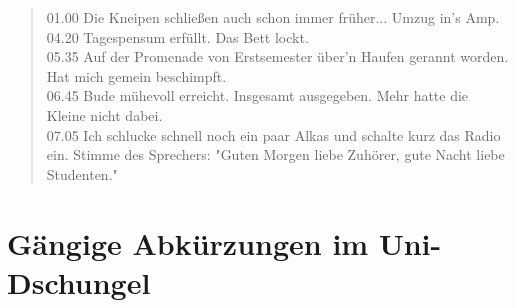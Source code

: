 \begin{verse}
01.00 Die Kneipen schließen auch schon immer früher... Umzug in's Amp.\\ 
04.20 Tagespensum erfüllt. Das Bett lockt.\\ 
05.35 Auf der Promenade von Erstsemester über'n Haufen gerannt worden. Hat mich gemein beschimpft.\\ 
06.45 Bude mühevoll erreicht. Insgesamt \unit[15]{\officialeuro}  ausgegeben. Mehr hatte die Kleine nicht dabei.\\ 
07.05 Ich schlucke schnell noch ein paar Alkas und schalte kurz das Radio ein. Stimme des Sprechers: "Guten Morgen liebe Zuhörer, gute Nacht liebe Studenten."\\
\end{verse}

\newpage
\section{Gängige Abkürzungen im Uni-Dschungel}

